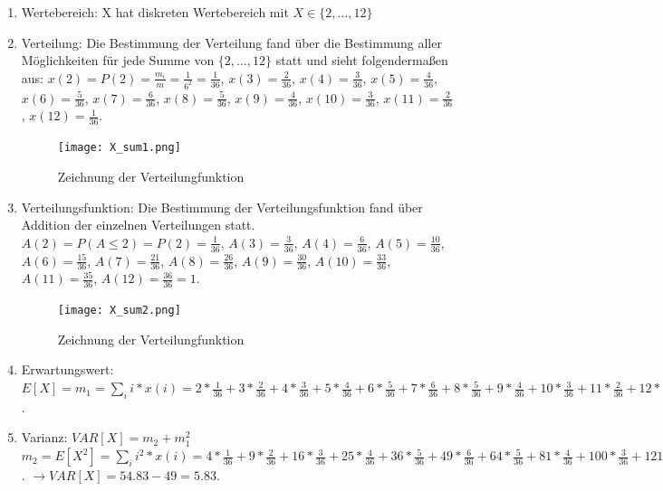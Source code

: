 \documentclass[%
10pt,              %
ngerman,           %
a4paper,           %
DIV11,             %
]{scrartcl}%
\begin{document}
\begin{enumerate}
	\item Wertebereich: X hat diskreten Wertebereich mit $X \in \{2, \dots, 12 \}$
	\item Verteilung: Die Bestimmung der Verteilung fand über die Bestimmung aller Möglichkeiten für jede Summe von $\{2, \dots, 12 \}$ statt und sieht folgendermaßen aus:\newline
	$x(2) = P(2) = \frac{m_i}{m} = \frac{1}{6^2} = \frac{1}{36}$,\newline
	$x(3) = \frac{2}{36}$, $x(4) = \frac{3}{36}$, $x(5) = \frac{4}{36}$, $x(6) = \frac{5}{36}$, $x(7) = \frac{6}{36}$, $x(8) = \frac{5}{36}$, $x(9) = \frac{4}{36}$, $x(10) = \frac{3}{36}$, $x(11) = \frac{2}{36}$, $x(12) = \frac{1}{36}$. 
	
	\begin{figure}[!htbp]
		\centering
		\caption{Zeichnung der Verteilungfunktion}
		\texttt{[image: X\_sum1.png]}
	\end{figure}
	
	\item Verteilungsfunktion: Die Bestimmung der Verteilungsfunktion fand über Addition der einzelnen Verteilungen statt.\newline
	$A(2) = P(A \leq 2) = P(2) = \frac{1}{36}$,\newline
	$A(3) = \frac{3}{36}$, $A(4) = \frac{6}{36}$, $A(5) = \frac{10}{36}$, $A(6) = \frac{15}{36}$, $A(7) = \frac{21}{36}$, $A(8) = \frac{26}{36}$, $A(9) = \frac{30}{36}$, $A(10) = \frac{33}{36}$, $A(11) = \frac{35}{36}$, $A(12) = \frac{36}{36} = 1$. 
	
	\begin{figure}[!htbp]
		\centering
		\caption{Zeichnung der Verteilungfunktion}
		\texttt{[image: X\_sum2.png]}
	\end{figure}
	
	\item Erwartungswert: $E[X] = m_1 = \sum_{i} i * x(i) = 2 * \frac{1}{36} + 3 * \frac{2}{36} + 4 * \frac{3}{36} + 5 * \frac{4}{36} + 6 * \frac{5}{36} + 7 * \frac{6}{36} + 8 * \frac{5}{36} + 9 * \frac{4}{36} + 10 * \frac{3}{36} + 11 * \frac{2}{36} + 12 * \frac{1}{36} = 7$.
	\item Varianz: $VAR[X] = m_2 + m_1^2$\newline
	$m_2 = E[X^2] = \sum_{i} i^2 * x(i) = 4 * \frac{1}{36} + 9 * \frac{2}{36} + 16 * \frac{3}{36} + 25 * \frac{4}{36} + 36 * \frac{5}{36} + 49 * \frac{6}{36} + 64 * \frac{5}{36} + 81 * \frac{4}{36} + 100 * \frac{3}{36} + 121 * \frac{2}{36} + 144 * \frac{1}{36} \approx 54.83$.\newline
	$\rightarrow VAR[X] = 54.83 - 49 = 5.83$.
\end{enumerate}
\end{document}
